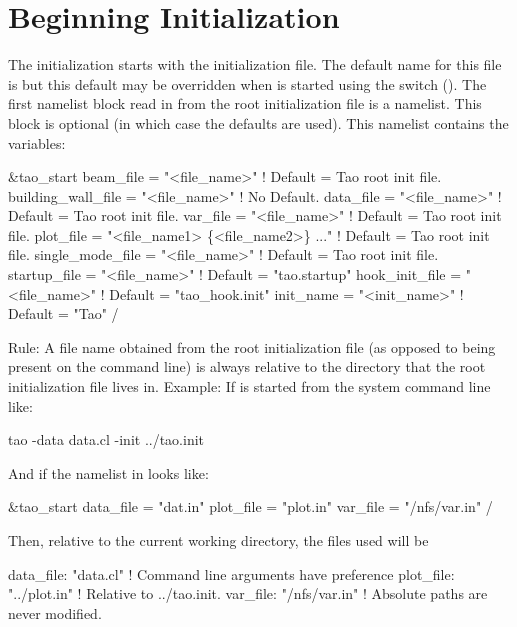 \section{Beginning Initialization}
\label{s:init.global} 

The initialization starts with the  \tao initialization file. The default name for this
file is  but this default may be overridden when \tao is started using the 
switch (). The first namelist block read in from the root initialization file is a
 namelist. This block is optional (in which case the defaults are used).  This
namelist contains the variables:
\begin{example}
  &tao_start
    beam_file          = "<file_name>"  ! Default = Tao root init file.
    building_wall_file = "<file_name>"  ! No Default.
    data_file          = "<file_name>"  ! Default = Tao root init file.
    var_file           = "<file_name>"  ! Default = Tao root init file.
    plot_file          = "<file_name1> \{<file_name2>\} ..."  
                                        ! Default = Tao root init file.
    single_mode_file   = "<file_name>"  ! Default = Tao root init file.
    startup_file       = "<file_name>"  ! Default = "tao.startup"
    hook_init_file     = "<file_name>"  ! Default = "tao_hook.init"
    init_name          = "<init_name>"  ! Default = "Tao"
  /
\end{example}
Rule: A file name obtained from the \tao root initialization file (as opposed to being present on
the command line) is always relative to the directory that the \tao root initialization file lives
in. Example: If \tao is started from the system command line like:
\begin{example}
    tao -data data.cl -init ../tao.init
\end{example}
And if the  namelist in  looks like:
\begin{example}
  &tao_start
    data_file = "dat.in"
    plot_file = "plot.in"
    var_file  = "/nfs/var.in"
  /
\end{example}
Then, relative to the current working directory, the files used will be
\begin{example}
  data_file: "data.cl"      ! Command line arguments have preference
  plot_file: "../plot.in"   ! Relative to ../tao.init.
  var_file:  "/nfs/var.in"  ! Absolute paths are never modified.
\end{example}

